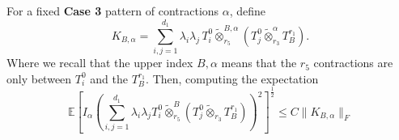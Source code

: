 \documentclass[]{article}
\numberwithin{equation}{section}
\theoremstyle{definition}
\newcommand{\EE}{\mathbb{E}}
\begin{document}
For a fixed \textbf{Case 3} pattern of contractions \(\alpha\), define
\begin{equation}
K_{B,\alpha} =\sum_{i,j=1}^{d_1}
\lambda_i\lambda_j\,T_i^0\tilde\otimes_{r_5}^{B,\alpha}\left(T_j^0\tilde\otimes_{r_3}^{\alpha}
T_B^{r_1}
\right).    
\end{equation}
Where we recall that the upper index \(B,\alpha\) means that the \(r_5\) contractions are only between \(T_i^0\) and the \(T_B^{r_1}\). Then, computing the expectation
\begin{equation}
    \EE \left [I_{\alpha} \left (\sum_{i,j=1}^{d_1}\lambda_i \lambda_jT_{i}^{0} \tilde{\otimes}_{r_5}^{B} \left (  T^{0}_{j} \tilde{\otimes}_{r_3}T^{r_1}_{B}\right )\right )^{2}\right ]^{\frac{1}{2}} \leq C \|K_{B,\alpha}\|_F
\end{equation}
\end{document}
